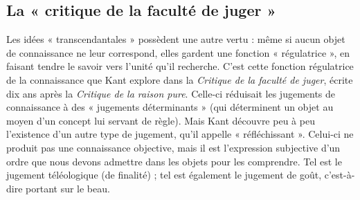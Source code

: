 \subsection{La « critique de la faculté de juger »}

Les idées « transcendantales » possèdent
une autre vertu : même si aucun objet
de connaissance ne leur correspond,
elles gardent une fonction « régulatrice »,
en faisant tendre le savoir vers l'unité
qu'il recherche. C'est cette fonction
régulatrice de la connaissance que Kant
explore dans la {\it Critique de la faculté de
juger}, écrite dix ans après la {\it Critique de
la raison pure}. Celle-ci réduisait les
jugements de connaissance à des « jugements
déterminants » (qui déterminent
un objet au moyen d’un concept lui servant
de règle). Mais Kant découvre peu
à peu l'existence d’un autre type de
jugement, qu’il appelle « réfléchissant ».
Celui-ci ne produit pas une connaissance
objective, mais il est l'expression
subjective d’un ordre que nous devons
admettre dans les objets pour les
comprendre. Tel est le jugement
téléologique (de finalité) ; tel est également
le jugement de goût, c'est-à-dire
portant sur le beau.

